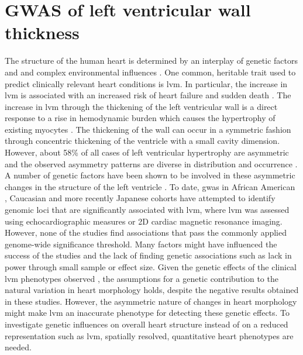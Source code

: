 \chapter{GWAS of left ventricular wall thickness}
\label{chapter:GWAS-3Dheart}
The structure of the human heart is determined by an interplay of genetic factors and and complex environmental influences \citep{Payne1995, Sanoudou2005, OToole2008}. One common, heritable trait used to predict clinically relevant heart conditions is \gls{lvm}. In particular, the increase in \gls{lvm} is associated with an increased risk of heart failure and sudden death \citep{Haider1998,Post1997,Lorell2000}.  The increase in \gls{lvm} through the thickening of the left ventricular wall is a direct response to a rise in hemodynamic burden which causes the hypertrophy of existing myocytes \citep{Lorell2000}. The thickening of the wall can occur in a symmetric fashion through concentric thickening of the ventricle with a small cavity dimension. However, about \num{58}\%  of all cases of left ventricular hypertrophy are asymmetric \citep{Davies1995} and the observed asymmetry patterns are diverse in distribution and occurrence \citep{Hughes2004,Florian2012}. A number of genetic factors have been shown to be involved in these asymmetric changes in the structure of the left ventricle \citep{Davies1995,Chen1999,VanderMerwe2008}. To date, \gls{gwas} in African American \citep{Fox2013}, Caucasian \citep{Vasan2007, Vasan2009, Arnett2009} and more recently Japanese cohorts \citep{Sano2016} have attempted to identify genomic loci that are significantly associated with \gls{lvm}, where \gls{lvm} was assessed using echocardiographic measures or 2D cardiac magnetic resonance imaging. However, none of the studies find associations that pass the commonly applied genome-wide significance threshold. Many factors might have influenced the success of the studies and the lack of finding genetic associations such as lack in power through small sample or effect size. Given the genetic effects of the clinical \gls{lvm} phenotypes observed \citep{Davies1995,Chen1999,VanderMerwe2008}, the assumptions for a genetic contribution to the natural variation in heart morphology holds, despite the negative results obtained in these studies. However, the asymmetric nature of changes in heart morphology might make \gls{lvm} an inaccurate phenotype for detecting these genetic effects. To investigate genetic influences on overall heart structure instead of on a reduced representation such as \gls{lvm}, spatially resolved, quantitative heart phenotypes are needed. 

